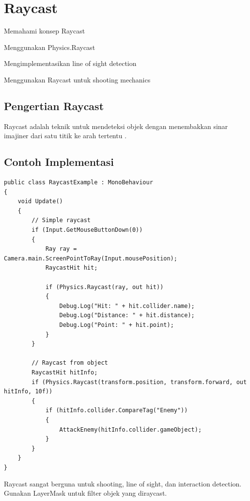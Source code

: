 
\section{Raycast}

\begin{learningoutcomes}
\item Memahami konsep Raycast
\item Menggunakan Physics.Raycast
\item Mengimplementasikan line of sight detection
\item Menggunakan Raycast untuk shooting mechanics
\end{learningoutcomes}

\subsection{Pengertian Raycast}

\begin{definisi}[Raycast]
Raycast adalah teknik untuk mendeteksi objek dengan menembakkan sinar imajiner dari satu titik ke arah tertentu \cite{UnityPhysics2024}.
\end{definisi}

\subsection{Contoh Implementasi}

\begin{lstlisting}[language={[Sharp]C}]
public class RaycastExample : MonoBehaviour
{
    void Update()
    {
        // Simple raycast
        if (Input.GetMouseButtonDown(0))
        {
            Ray ray = Camera.main.ScreenPointToRay(Input.mousePosition);
            RaycastHit hit;
            
            if (Physics.Raycast(ray, out hit))
            {
                Debug.Log("Hit: " + hit.collider.name);
                Debug.Log("Distance: " + hit.distance);
                Debug.Log("Point: " + hit.point);
            }
        }
        
        // Raycast from object
        RaycastHit hitInfo;
        if (Physics.Raycast(transform.position, transform.forward, out hitInfo, 10f))
        {
            if (hitInfo.collider.CompareTag("Enemy"))
            {
                AttackEnemy(hitInfo.collider.gameObject);
            }
        }
    }
}
\end{lstlisting}

\begin{catatan}
Raycast sangat berguna untuk shooting, line of sight, dan interaction detection. Gunakan LayerMask untuk filter objek yang diraycast.
\end{catatan}
